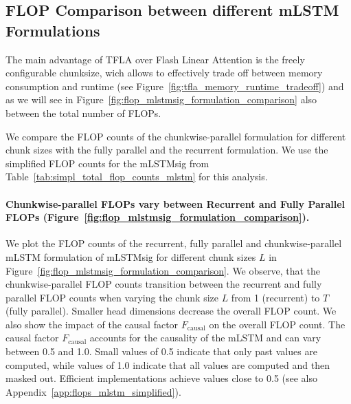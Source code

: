 \documentclass{article}
\begin{document}
    \subsection{FLOP Comparison between different mLSTM Formulations}
    \label{app:flops_mlstm_chunkwise_vs_parallel_vs_recurrent}
    \vspace{-0.1cm}
    The main advantage of TFLA over Flash Linear Attention is the freely configurable chunksize, wich allows to effectively trade off between memory consumption and runtime (see Figure~\ref{fig:tfla_memory_runtime_tradeoff}) and as we will see in Figure~\ref{fig:flop_mlstmsig_formulation_comparison} also between the total number of FLOPs.

    We compare the FLOP counts of the chunkwise-parallel formulation for different chunk sizes with the fully parallel and the recurrent formulation.
    We use the simplified FLOP counts for the mLSTMsig from Table~\ref{tab:simpl_total_flop_counts_mlstm} for this analysis.

    \paragraph{Chunkwise-parallel FLOPs vary between Recurrent and Fully Parallel FLOPs (Figure~\ref{fig:flop_mlstmsig_formulation_comparison}).} We plot the FLOP counts of the recurrent, fully parallel and chunkwise-parallel mLSTM formulation of mLSTMsig for different chunk sizes $L$ in Figure~\ref{fig:flop_mlstmsig_formulation_comparison}.
    We observe, that the chunkwise-parallel FLOP counts transition between the recurrent and fully parallel FLOP counts when varying the chunk size $L$ from 1 (recurrent) to $T$ (fully parallel).
    Smaller head dimensions decrease the overall FLOP count.
    We also show the impact of the causal factor $F_\text{causal}$ on the overall FLOP count. The causal factor $F_\text{causal}$ accounts for the causality of the mLSTM and can vary between 0.5 and 1.0.
    Small values of 0.5 indicate that only past values are computed, while values of 1.0 indicate that all values are computed and then masked out. Efficient implementations achieve values close to 0.5 (see also Appendix~\ref{app:flops_mlstm_simplified}).
\end{document}
